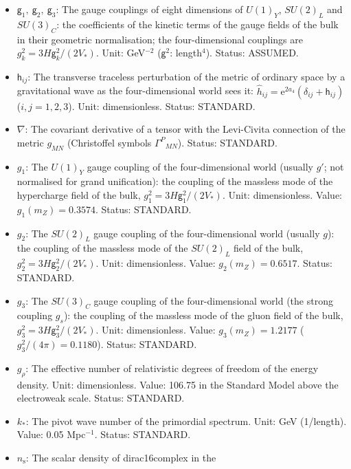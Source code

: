 \documentclass[
  10pt,
]{article}
\begin{document}
\begin{itemize}
  extra times. Unit: dimensionless. Status: DERIVED.
\item
  \(\mathsf{g}_1,\ \mathsf{g}_2,\ \mathsf{g}_3\): The gauge couplings of
  eight dimensions of \(U(1)_Y\), \(SU(2)_L\) and \(SU(3)_C\): the
  coefficients of the kinetic terms of the gauge fields of the bulk in
  their geometric normalisation; the four-dimensional couplings are
  \(g_k^2 = 3H\mathsf{g}_k^2/(2V_*)\). Unit: GeV\(^{-2}\)
  (\(\mathsf{g}^2\): length\(^4\)). Status: ASSUMED.
\item
  \(\mathsf{h}_{ij}\): The transverse traceless perturbation of the
  metric of ordinary space by a gravitational wave as the
  four-dimensional world sees it:
  \(\hat h_{ij} = \mathrm{e}^{2a_4}(\delta_{ij} + \mathsf{h}_{ij})\)
  (\(i, j = 1, 2, 3\)). Unit: dimensionless. Status: STANDARD.
\item
  \(\nabla\): The covariant derivative of a tensor with the Levi-Civita
  connection of the metric \(g_{MN}\) (Christoffel symbols
  \(\Gamma^P{}_{MN}\)). Status: STANDARD.
\item
  \(g_1\): The \(U(1)_Y\) gauge coupling of the four-dimensional world
  (usually \(g'\); not normalised for grand unification): the coupling
  of the massless mode of the hypercharge field of the bulk,
  \(g_1^2 = 3H\mathsf{g}_1^2/(2V_*)\). Unit: dimensionless. Value:
  \(g_1(m_Z) = 0.3574\). Status: STANDARD.
\item
  \(g_2\): The \(SU(2)_L\) gauge coupling of the four-dimensional world
  (usually \(g\)): the coupling of the massless mode of the \(SU(2)_L\)
  field of the bulk, \(g_2^2 = 3H\mathsf{g}_2^2/(2V_*)\). Unit:
  dimensionless. Value: \(g_2(m_Z) = 0.6517\). Status: STANDARD.
\item
  \(g_3\): The \(SU(3)_C\) gauge coupling of the four-dimensional world
  (the strong coupling \(g_s\)): the coupling of the massless mode of
  the gluon field of the bulk, \(g_3^2 = 3H\mathsf{g}_3^2/(2V_*)\).
  Unit: dimensionless. Value: \(g_3(m_Z) = 1.2177\)
  (\(g_3^2/(4\pi) = 0.1180\)). Status: STANDARD.
\item
  \(g_\rho\): The effective number of relativistic degrees of freedom of
  the energy density. Unit: dimensionless. Value: 106.75 in the Standard
  Model above the electroweak scale. Status: STANDARD.
\item
  \(k_*\): The pivot wave number of the primordial spectrum. Unit: GeV
  (1/length). Value: 0.05 Mpc\(^{-1}\). Status: STANDARD.
\item
  \(n_{\mathrm{s}}\): The scalar density of dirac16complex in the

\end{itemize}
\end{document}
